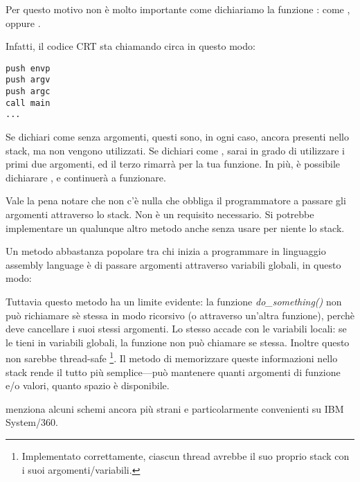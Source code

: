 \label{main_arguments}
\par
Per questo motivo non è molto importante come dichiariamo la funzione \main: come \main, \\
 oppure .

Infatti, il codice \ac{CRT} sta chiamando \main circa in questo modo:

\begin{lstlisting}[style=customasmx86]
push envp
push argv
push argc
call main
...
\end{lstlisting}

Se dichiari \main come \main senza argomenti, questi sono, in ogni caso, ancora presenti nello stack, ma non vengono utilizzati.
Se dichiari \main come ,
sarai in grado di utilizzare i primi due argomenti, ed il terzo rimarrà  per la tua funzione.
In più, è possibile dichiarare , e continuerà a funzionare.



Vale la pena notare che non c'è nulla che obbliga il programmatore a passare gli argomenti attraverso lo stack. Non è un requisito necessario.
Si potrebbe implementare un qualunque altro metodo anche senza usare per niente lo stack.

Un metodo abbastanza popolare tra chi inizia a programmare in linguaggio assembly language è di passare argomenti attraverso variabili globali, in questo modo:



Tuttavia questo metodo ha un limite evidente: la funzione \emph{do\_something()} non può richiamare sè stessa in modo ricorsivo (o attraverso un'altra funzione),
perchè deve cancellare i suoi stessi argomenti.
Lo stesso accade con le variabili locali: se le tieni in variabili globali, la funzione non può chiamare se stessa.
Inoltre questo non sarebbe thread-safe
\footnote{Implementato correttamente, ciascun thread avrebbe il suo proprio stack con i suoi argomenti/variabili.}.
Il metodo di memorizzare queste informazioni nello stack rende il tutto più semplice---può mantenere quanti argomenti di funzione e/o valori,
quanto spazio è disponibile.

 menziona alcuni schemi ancora più strani e particolarmente convenienti su IBM System/360.

